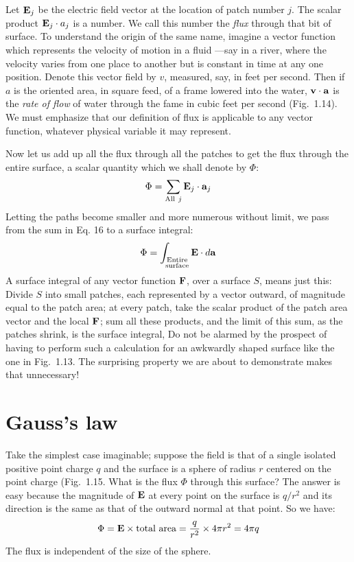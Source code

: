 Let $\mathbf{E}_j$ be the electric field vector at the location of patch
number $j$. The scalar product $\mathbf{E}_j \cdot a_j$ is a number.
We call this number the \emph{flux} through that bit of surface.
To understand the origin of the same name, imagine a vector function
which represents the velocity of motion in a fluid ---say in a river,
where the velocity varies from one place to another but is constant
in time at any one position. Denote this vector field by $v$,
measured, say, in feet per second. Then if $a$ is the oriented area,
in square feed, of a frame lowered into the water, $\mathbf{v} \cdot \mathbf{a}$
is the \emph{rate of flow} of water through the fame in cubic feet
per second (Fig.~1.14). We must emphasize that our definition of
flux is applicable to any vector function, whatever physical variable
it may represent.

Now let us add up all the flux through all the patches to get the
flux through the entire surface, a scalar quantity which we shall
denote by $\Phi$:
\begin{equation} 
  \Phi= \sum\limits_{\text{All}~j}\mathbf{E}_j \cdot \mathbf{a}_j 
\end{equation}
Letting the paths become smaller and more numerous without limit, we
pass from the sum in Eq. 16 to a surface integral:
\begin{equation}
  \Phi= \int\nolimits_{\substack{\text{Entire}\\\text{surface}}}\mathbf{E} \cdot d\mathbf{a}
\end{equation}
A surface integral of any vector function $\mathbf{F}$, over a surface
$S$, means just this: Divide $S$ into small patches, each represented
by a vector outward, of magnitude equal to the patch area; at every
patch, take the scalar product of the patch area vector and the local
$\mathbf{F}$; sum all these products, and the limit of this sum, as the
patches shrink, is the surface integral, Do not be alarmed by the
prospect of having to perform such a calculation for an awkwardly
shaped surface like the one in Fig.~1.13. The surprising property
we are about to demonstrate makes that unnecessary!

\section{Gauss's law}

Take the simplest case imaginable; suppose the field is that of a
single isolated positive point charge $q$ and the surface is a sphere
of radius $r$ centered on the point charge (Fig.~1.15. What is the
flux $\Phi$ through this surface? The answer is easy because the
magnitude of $\mathbf{E}$ at every point on the surface is $q/r^2$ and its
direction is the same as that of the outward normal at that point.
So we have:
\begin{equation} 
  \Phi =  {\mathbf{E}}\times \text{total area} = \frac{q}{r^2} \times 4\pi r^2 =  4\pi q 
\end{equation}
The flux is independent of the size of the sphere.


